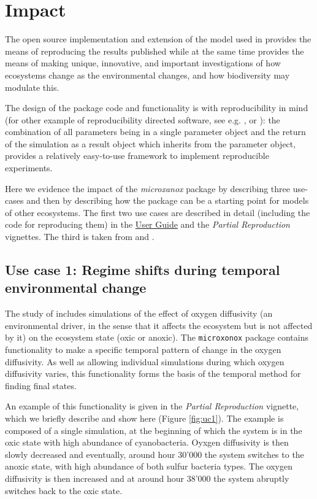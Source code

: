 \documentclass[]{elsarticle} %
\begin{document}
\section{Impact}\label{impact}

The open source implementation and extension of the model used in \citet{Bush2017} provides the means of reproducing the results published while at the same time provides the means of making unique, innovative, and important investigations of how ecosystems change as the environmental changes, and how biodiversity may modulate this.

The design of the package code and functionality is with reproducibility in mind (for other example of reproducibility directed software, see e.g. \citet{Correndo2023}, \citet{Spillner2022} or \citet{Fox2020}): the combination of all parameters being in a single parameter object and the return of the simulation as a result object which inherits from the parameter object, provides a relatively easy-to-use framework to implement reproducible experiments.

Here we evidence the impact of the \emph{microxanox} package by describing three use-cases and then by describing how the package can be a starting point for models of other ecosystems. The first two use cases are described in detail (including the code for reproducing them) in the \href{https://uzh-peg.r-universe.dev/articles/microxanox/User-guide.html}{User Guide} and the \emph{Partial Reproduction} vignettes. The third is taken from \citet{Limberger2023} and \citet{Petchey2022}.

\subsection{Use case 1: Regime shifts during temporal environmental change}\label{use-case-1-regime-shifts-during-temporal-environmental-change}

The study of \citet{Bush2017} includes simulations of the effect of oxygen diffusivity (an environmental driver, in the sense that it affects the ecosystem but is not affected by it) on the ecosystem state (oxic or anoxic). The \texttt{microxonox} package contains functionality to make a specific temporal pattern of change in the oxygen diffusivity. As well as allowing individual simulations during which oxygen diffusivity varies, this functionality forms the basis of the temporal method for finding final states.

An example of this functionality is given in the \emph{Partial Reproduction} vignette, which we briefly describe and show here (Figure \ref{fig:uc1}). The example is composed of a single simulation, at the beginning of which the system is in the oxic state with high abundance of cyanobacteria. Oyxgen diffusivity is then slowly decreased and eventually, around hour 30'000 the system switches to the anoxic state, with high abundance of both sulfur bacteria types. The oxygen diffusivity is then increased and at around hour 38'000 the system abruptly switches back to the oxic state.
\end{document}
